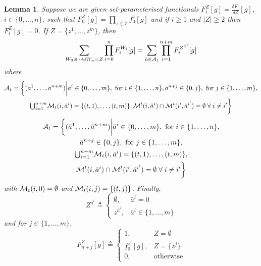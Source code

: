 \documentclass[journal,twoside]{IEEEtran}
\theoremstyle{plain}
\newtheorem{lemma}{Lemma}
\begin{document}
\begin{lemma}\label{lem:ConvolutionEquiv}
Suppose we are given set-parameterised functionals $F_i^Z[g]=\frac{\delta F_i}{\delta Z}[g]$, $i\in\{0,...,n\}$, such that $F_0^Z[g]=\prod_{z\in Z}f_0^z[g]$ and if $i\geq 1$ and $|Z|\geq 2$ then $F_i^Z[g]=0$. If $Z = \{z^1,\dots,z^{m}\}$, then
%
\begin{equation}
\sum_{W_0 \uplus \cdots \uplus W_n=Z}\prod_{i=0}^n F_i^{W_i}[g]
= \sum_{\bar{a}\in{\cal A}_t}\prod_{i=1}^{n+m} F_i^{Z^{\bar{a}^i}}[g]
\end{equation}
%
where
%
\ifCLASSOPTIONdraftcls
\begin{multline}
{\cal A}_t = \bigg\{
(\bar{a}^1,\dots,\bar{a}^{n+m})
\bigg| 
\bar{a}^i\in\{0,\dots,m\},\mbox{ for } i\in\{1,\dots,n\}, 
\bar{a}^{n+j}\in\{0,j\},\mbox{ for } j\in\{1,\dots,m\}, \\
{\textstyle\bigcup_{i=1}^{n+m}}{\cal M}_t(i,\bar{a}^i)=\{(t,1),\dots,(t,m)\},
{\cal M}^t(i,\bar{a}^i)\cap{\cal M}^t(i',\bar{a}^{i'})=\emptyset \;\forall\; i\neq i' 
\bigg\}
\end{multline}
\else
\begin{multline}
{\cal A}_t = \bigg\{
(\bar{a}^1,\dots,\bar{a}^{n+m})
\bigg| 
\bar{a}^i\in\{0,\dots,m\},\mbox{ for } i\in\{1,\dots,n\}, \\
\bar{a}^{n+j}\in\{0,j\},\mbox{ for } j\in\{1,\dots,m\}, \\
{\textstyle\bigcup_{i=1}^{n+m}}{\cal M}_t(i,\bar{a}^i)=\{(t,1),\dots,(t,m)\},
\\
{\cal M}^t(i,\bar{a}^i)\cap{\cal M}^t(i',\bar{a}^{i'})=\emptyset \;\forall\; i\neq i' 
\bigg\}
\end{multline}
\fi
%
with ${\cal M}_t(i,0)=\emptyset$ and ${\cal M}_t(i,j)=\{(t,j)\}$. Finally,
%
\begin{equation}
Z^{\bar{a}^i} \triangleq \begin{cases}
\emptyset, & \bar{a}^i = 0 \\
z^{\bar{a}^i}, & \bar{a}^i \in\{1,\dots,m\}
\end{cases}
\end{equation}
%
and for $j\in\{1,\dots,m\}$,
%
\begin{equation}
F_{n+j}^Z[g] \triangleq \begin{cases}
1, & Z=\emptyset \\
f_0^{z^j}[g], & Z=\{z^j\} \\
0, & \mbox{otherwise}
\end{cases} 
\end{equation}
\end{lemma}
\end{document}
